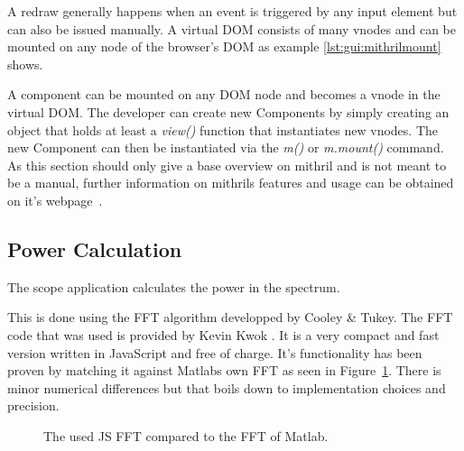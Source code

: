 A redraw generally happens when an event is triggered by any input element but
can also be issued manually.
A virtual DOM  consists of many vnodes and  can be mounted on any  node of the
browser's DOM as example \ref{lst:gui:mithrilmount} shows.


A component can be mounted on any DOM  node and becomes a vnode in the virtual
DOM. The developer can create new Components by simply creating an object that
holds at least a \textit{view()} function that instantiates new vnodes.
The  new  Component   can  then  be  instantiated  via   the  \textit{m()}  or
\textit{m.mount()} command.
As this section should  only give a base overview on mithril  and is not meant
to be  a manual,  further information  on mithrils features  and usage  can be
obtained on it's webpage~\cite{mithril:home}.

\subsection{Power Calculation}

The scope application calculates the power in the spectrum.

This is  done using the FFT  algorithm developped by Cooley  \& Tukey. The FFT
code  that was  used  is provided  by  Kevin Kwok  \cite{kwok}. It  is a  very
compact  and fast  version  written  in JavaScript  and  free of  charge. It's
functionality has been  proven by matching it against Matlabs  own FFT as seen
in Figure~\ref{fig:gui:fft_comparison}. There  is minor  numerical differences
but that boils down to implementation choices and precision.

\begin{figure}
    \centering
    
    \caption[FFT comparison]{%
        The used JS FFT compared to the FFT of Matlab.%
    }
    \label{fig:gui:fft_comparison}
\end{figure}


